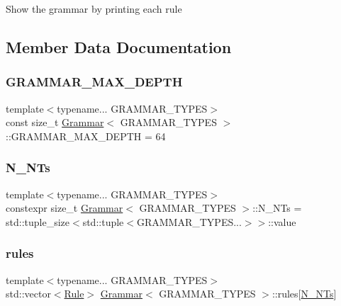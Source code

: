 Show the grammar by printing each rule

\subsection{Member Data Documentation}
\mbox{\label{class_grammar_a4a0d1d38426ce7f1b68c001e9ddec064}} 
\subsubsection{\texorpdfstring{G\+R\+A\+M\+M\+A\+R\+\_\+\+M\+A\+X\+\_\+\+D\+E\+P\+TH}{GRAMMAR\_MAX\_DEPTH}}
{\footnotesize\ttfamily template$<$typename... G\+R\+A\+M\+M\+A\+R\+\_\+\+T\+Y\+P\+ES$>$ \\
const size\+\_\+t \hyperlink{class_grammar}{Grammar}$<$ G\+R\+A\+M\+M\+A\+R\+\_\+\+T\+Y\+P\+ES $>$\+::G\+R\+A\+M\+M\+A\+R\+\_\+\+M\+A\+X\+\_\+\+D\+E\+P\+TH = 64\hspace{0.3cm}{\ttfamily [static]}}

\mbox{\label{class_grammar_a45877d4d7a5ee98bf6753af593d6ca08}} 
\subsubsection{\texorpdfstring{N\+\_\+\+N\+Ts}{N\_NTs}}
{\footnotesize\ttfamily template$<$typename... G\+R\+A\+M\+M\+A\+R\+\_\+\+T\+Y\+P\+ES$>$ \\
constexpr size\+\_\+t \hyperlink{class_grammar}{Grammar}$<$ G\+R\+A\+M\+M\+A\+R\+\_\+\+T\+Y\+P\+ES $>$\+::N\+\_\+\+N\+Ts = std\+::tuple\+\_\+size$<$std\+::tuple$<$G\+R\+A\+M\+M\+A\+R\+\_\+\+T\+Y\+P\+E\+S...$>$$>$\+::value\hspace{0.3cm}{\ttfamily [static]}}

\mbox{\label{class_grammar_a8a89ced0753d72f52ccf2b04c0ccc82b}} 
\subsubsection{\texorpdfstring{rules}{rules}}
{\footnotesize\ttfamily template$<$typename... G\+R\+A\+M\+M\+A\+R\+\_\+\+T\+Y\+P\+ES$>$ \\
std\+::vector$<$\hyperlink{class_rule}{Rule}$>$ \hyperlink{class_grammar}{Grammar}$<$ G\+R\+A\+M\+M\+A\+R\+\_\+\+T\+Y\+P\+ES $>$\+::rules\mbox{[}\hyperlink{class_grammar_a45877d4d7a5ee98bf6753af593d6ca08}{N\+\_\+\+N\+Ts}\mbox{]}}

